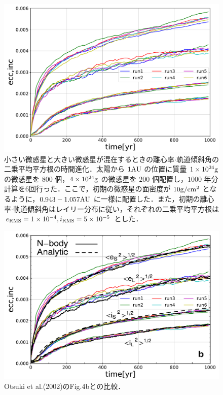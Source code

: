 \documentclass[11pt,a4paper,oneside,onecolumn]{jreport}
\begin{document}
\begin{figure}[H]
 \centering
 \includegraphics[width=12cm]{./image/Nbodytest_figb_6run.pdf}
 \caption{小さい微惑星と大きい微惑星が混在するときの離心率$\cdot$軌道傾斜角の二乗平均平方根の時間進化．太陽から $1 {\rm AU}$ の位置に質量 $1 \times 10^{24} {\rm g}$ の微惑星を $800$ 個，$4 \times 10^{24} {\rm g}$ の微惑星を $200$ 個配置し，$1000$ 年分計算を6回行った．ここで，初期の微惑星の面密度が $10 {\rm g/cm^2}$ となるように，$0.943 - 1.057 {\rm AU}$ に一様に配置した．また，初期の離心率$\cdot$軌道傾斜角はレイリー分布に従い，それぞれの二乗平均平方根は $e_{\rm RMS} = 1 \times 10^{-4}, i_{\rm RMS} = 5 \times 10^{-5}$ とした．\label{}}
\end{figure}


\begin{figure}[H]
 \centering
 \includegraphics[width=12cm]{./image/Ohtsuki_figb_and_Nbodytest_6run.pdf}
 \caption{Otsuki et al.(2002)のFig.4bとの比較．\label{}}
\end{figure}
\end{document}
